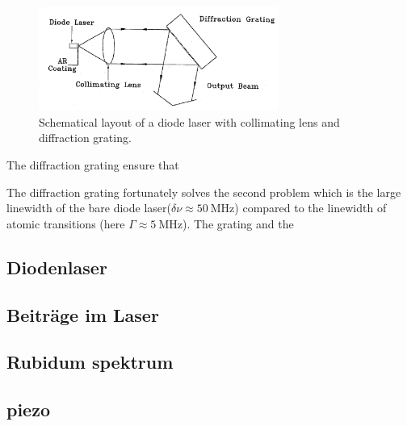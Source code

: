 \begin{figure}
  \centering
  \includegraphics[width=0.7\textwidth]{aufbau.png}
  \caption{Schematical layout of a diode laser with collimating lens and diffraction grating.}
  \label{fig:aufbau}
\end{figure}
The diffraction grating ensure that

The diffraction grating fortunately solves the second
problem which is the large linewidth of the bare
diode laser($\delta \nu \approx \SI{50}{\mega\hertz}$)
compared to the linewidth of atomic transitions
(here $\Gamma \approx \SI{5}{\mega\hertz}$).
The grating and the


\subsection{Diodenlaser}
\label{subsec:diodenlaser}


\subsection{Beiträge im Laser}
\label{subsec:}



\subsection{Rubidum spektrum}
\label{subsec:}


\subsection{piezo}
\label{subsec:}
